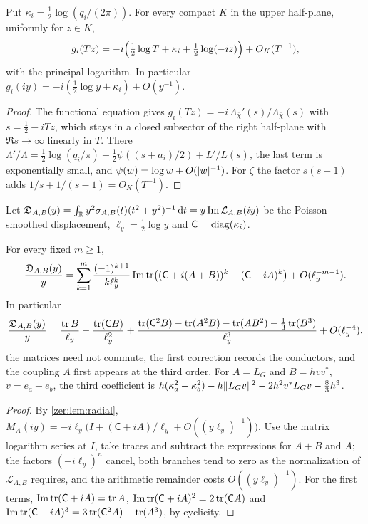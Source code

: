\begin{lemma}\label{zer:lem:radial}
Put $\kappa_i=\tfrac12\log(q_i/(2\pi))$. For every compact $K$ in the upper half-plane,
uniformly for $z\in K$,
\[
 g_i(Tz)=-i\Bigl(\tfrac12\log T+\kappa_i+\tfrac12\log(-iz)\Bigr)+O_K(T^{-1}),
\]
with the principal logarithm. In particular $g_i(iy)=-i(\tfrac12\log y+\kappa_i)+O(y^{-1})$.
\end{lemma}
\begin{proof}
The functional equation gives $g_i(Tz)=-i\,\Lambda_{\overline\chi}'(s)/\Lambda_{\overline\chi}(s)$ with
$s=\tfrac12-iTz$, which stays in a closed subsector of the right half-plane with $\Re s\to\infty$
linearly in $T$. There $\Lambda'/\Lambda=\tfrac12\log(q_i/\pi)+\tfrac12\psi((s+a_i)/2)+L'/L(s)$, the last
term is exponentially small, and $\psi(w)=\log w+O(\lvert w\rvert^{-1})$. For $\zeta$ the factor $s(s-1)$ adds
$1/s+1/(s-1)=O_K(T^{-1})$.
\end{proof}

Let
$\mathfrak D_{A,B}(y)=\int_{\mathbb{R}} y^2\sigma_{A,B}(t)(t^2+y^2)^{-1}\,\mathrm{d} t=y\operatorname{Im}\mathcal L_{A,B}(iy)$ be the
Poisson-smoothed displacement, $\ell_y=\tfrac12\log y$ and $\mathsf C=\operatorname{diag}(\kappa_i)$.

\begin{theorem}\label{zer:thm:transportexp}
For every fixed $m\ge1$,
\[
 \frac{\mathfrak D_{A,B}(y)}y=\sum_{k=1}^m\frac{(-1)^{k+1}}{k\ell_y^k}\operatorname{Im}\operatorname{tr}\bigl((\mathsf C+i(A+B))^k-(\mathsf C+iA)^k\bigr)+O(\ell_y^{-m-1}).
\]
In particular
\[
 \frac{\mathfrak D_{A,B}(y)}y=\frac{\operatorname{tr} B}{\ell_y}-\frac{\operatorname{tr}(\mathsf CB)}{\ell_y^2}
 +\frac{\operatorname{tr}(\mathsf C^2B)-\operatorname{tr}(A^2B)-\operatorname{tr}(AB^2)-\frac13\operatorname{tr}(B^3)}{\ell_y^3}+O(\ell_y^{-4}),
\]
the matrices need not commute, the first correction records the conductors, and the coupling $A$ first
appears at the third order. For $A=L_G$ and $B=hvv^*$, $v=e_a-e_b$, the third coefficient is
$h(\kappa_a^2+\kappa_b^2)-h\lVert L_Gv\rVert^2-2h^2v^*L_Gv-\tfrac83h^3$.
\end{theorem}
\begin{proof}
By \cref{zer:lem:radial}, $M_A(iy)=-i\ell_y\bigl(I+(\mathsf C+iA)/\ell_y+O((y\ell_y)^{-1})\bigr)$. Use the matrix
logarithm series at $I$, take traces and subtract the expressions for $A+B$ and $A$; the factors
$(-i\ell_y)^n$ cancel, both branches tend to zero as the normalization of $\mathcal L_{A,B}$ requires, and
the arithmetic remainder costs $O((y\ell_y)^{-1})$. For the first terms,
$\operatorname{Im}\operatorname{tr}(\mathsf C+iA)=\operatorname{tr} A$, $\operatorname{Im}\operatorname{tr}(\mathsf C+iA)^2=2\operatorname{tr}(\mathsf CA)$ and
$\operatorname{Im}\operatorname{tr}(\mathsf C+iA)^3=3\operatorname{tr}(\mathsf C^2A)-\operatorname{tr}(A^3)$, by cyclicity.
\end{proof}

